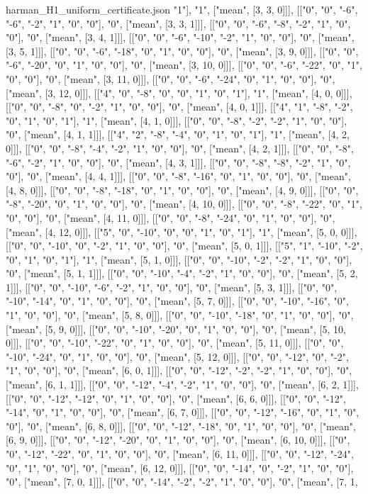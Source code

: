 \begin{filecontents*}[overwrite]{harman_H1_uniform_certificate.json}
"1"], "1", ["mean", [3, 3, 0]]], [["0", "0", "-6", "-6", "-2", "1", "0", "0"], "0", ["mean", [3, 3, 1]]], [["0", "0", "-6", "-8", "-2", "1", "0", "0"], "0", ["mean", [3, 4, 1]]], [["0", "0", "-6", "-10", "-2", "1", "0", "0"], "0", ["mean", [3, 5, 1]]], [["0", "0", "-6", "-18", "0", "1", "0", "0"], "0", ["mean", [3, 9, 0]]], [["0", "0", "-6", "-20", "0", "1", "0", "0"], "0", ["mean", [3, 10, 0]]], [["0", "0", "-6", "-22", "0", "1", "0", "0"], "0", ["mean", [3, 11, 0]]], [["0", "0", "-6", "-24", "0", "1", "0", "0"], "0", ["mean", [3, 12, 0]]], [["4", "0", "-8", "0", "0", "1", "0", "1"], "1", ["mean", [4, 0, 0]]], [["0", "0", "-8", "0", "-2", "1", "0", "0"], "0", ["mean", [4, 0, 1]]], [["4", "1", "-8", "-2", "0", "1", "0", "1"], "1", ["mean", [4, 1, 0]]], [["0", "0", "-8", "-2", "-2", "1", "0", "0"], "0", ["mean", [4, 1, 1]]], [["4", "2", "-8", "-4", "0", "1", "0", "1"], "1", ["mean", [4, 2, 0]]], [["0", "0", "-8", "-4", "-2", "1", "0", "0"], "0", ["mean", [4, 2, 1]]], [["0", "0", "-8", "-6", "-2", "1", "0", "0"], "0", ["mean", [4, 3, 1]]], [["0", "0", "-8", "-8", "-2", "1", "0", "0"], "0", ["mean", [4, 4, 1]]], [["0", "0", "-8", "-16", "0", "1", "0", "0"], "0", ["mean", [4, 8, 0]]], [["0", "0", "-8", "-18", "0", "1", "0", "0"], "0", ["mean", [4, 9, 0]]], [["0", "0", "-8", "-20", "0", "1", "0", "0"], "0", ["mean", [4, 10, 0]]], [["0", "0", "-8", "-22", "0", "1", "0", "0"], "0", ["mean", [4, 11, 0]]], [["0", "0", "-8", "-24", "0", "1", "0", "0"], "0", ["mean", [4, 12, 0]]], [["5", "0", "-10", "0", "0", "1", "0", "1"], "1", ["mean", [5, 0, 0]]], [["0", "0", "-10", "0", "-2", "1", "0", "0"], "0", ["mean", [5, 0, 1]]], [["5", "1", "-10", "-2", "0", "1", "0", "1"], "1", ["mean", [5, 1, 0]]], [["0", "0", "-10", "-2", "-2", "1", "0", "0"], "0", ["mean", [5, 1, 1]]], [["0", "0", "-10", "-4", "-2", "1", "0", "0"], "0", ["mean", [5, 2, 1]]], [["0", "0", "-10", "-6", "-2", "1", "0", "0"], "0", ["mean", [5, 3, 1]]], [["0", "0", "-10", "-14", "0", "1", "0", "0"], "0", ["mean", [5, 7, 0]]], [["0", "0", "-10", "-16", "0", "1", "0", "0"], "0", ["mean", [5, 8, 0]]], [["0", "0", "-10", "-18", "0", "1", "0", "0"], "0", ["mean", [5, 9, 0]]], [["0", "0", "-10", "-20", "0", "1", "0", "0"], "0", ["mean", [5, 10, 0]]], [["0", "0", "-10", "-22", "0", "1", "0", "0"], "0", ["mean", [5, 11, 0]]], [["0", "0", "-10", "-24", "0", "1", "0", "0"], "0", ["mean", [5, 12, 0]]], [["0", "0", "-12", "0", "-2", "1", "0", "0"], "0", ["mean", [6, 0, 1]]], [["0", "0", "-12", "-2", "-2", "1", "0", "0"], "0", ["mean", [6, 1, 1]]], [["0", "0", "-12", "-4", "-2", "1", "0", "0"], "0", ["mean", [6, 2, 1]]], [["0", "0", "-12", "-12", "0", "1", "0", "0"], "0", ["mean", [6, 6, 0]]], [["0", "0", "-12", "-14", "0", "1", "0", "0"], "0", ["mean", [6, 7, 0]]], [["0", "0", "-12", "-16", "0", "1", "0", "0"], "0", ["mean", [6, 8, 0]]], [["0", "0", "-12", "-18", "0", "1", "0", "0"], "0", ["mean", [6, 9, 0]]], [["0", "0", "-12", "-20", "0", "1", "0", "0"], "0", ["mean", [6, 10, 0]]], [["0", "0", "-12", "-22", "0", "1", "0", "0"], "0", ["mean", [6, 11, 0]]], [["0", "0", "-12", "-24", "0", "1", "0", "0"], "0", ["mean", [6, 12, 0]]], [["0", "0", "-14", "0", "-2", "1", "0", "0"], "0", ["mean", [7, 0, 1]]], [["0", "0", "-14", "-2", "-2", "1", "0", "0"], "0", ["mean", [7, 1, 
\end{filecontents*}
